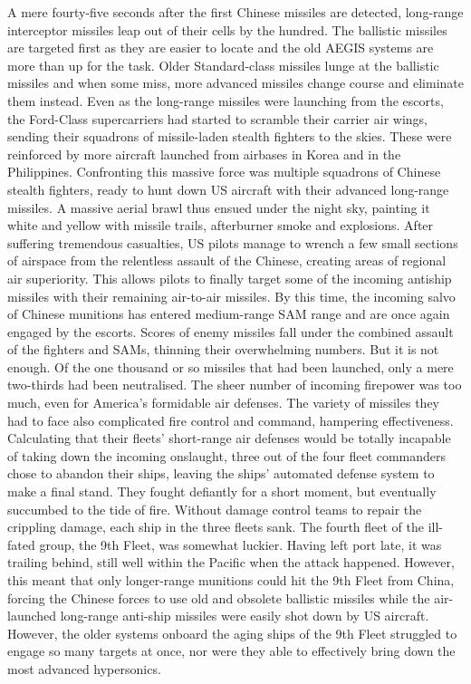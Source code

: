             A mere fourty-five seconds after the first Chinese missiles are detected, long-range interceptor missiles leap out of their cells by the hundred. The ballistic missiles are targeted first as they are easier to locate and the old AEGIS systems are more than up for the task. Older Standard-class missiles lunge at the ballistic missiles and when some miss, more advanced missiles change course and eliminate them instead.
            Even as the long-range missiles were launching from the escorts, the Ford-Class supercarriers had started to scramble their carrier air wings, sending their squadrons of missile-laden stealth fighters to the skies. These were reinforced by more aircraft launched from airbases in Korea and in the Philippines. Confronting this massive force was multiple squadrons of Chinese stealth fighters, ready to hunt down US aircraft with their advanced long-range missiles. A massive aerial brawl thus ensued under the night sky, painting it white and yellow with missile trails, afterburner smoke and explosions. After suffering tremendous casualties, US pilots manage to wrench a few small sections of airspace from the relentless assault of the Chinese, creating areas of regional air superiority. This allows pilots to finally target some of the incoming antiship missiles with their remaining air-to-air missiles.
            By this time, the incoming salvo of Chinese munitions has entered medium-range SAM range and are once again engaged by the escorts. Scores of enemy missiles fall under the combined assault of the fighters and SAMs, thinning their overwhelming numbers. But it is not enough. Of the one thousand or so missiles that had been launched, only a mere two-thirds had been neutralised. The sheer number of incoming firepower was too much, even for America's formidable air defenses. The variety of missiles they had to face also complicated fire control and command, hampering effectiveness.
            Calculating that their fleets' short-range air defenses would be totally incapable of taking down the incoming onslaught, three out of the four fleet commanders chose to abandon their ships, leaving the ships' automated defense system to make a final stand. They fought defiantly for a short moment, but eventually succumbed to the tide of fire. Without damage control teams to repair the crippling damage, each ship in the three fleets sank.
            The fourth fleet of the ill-fated group, the 9th Fleet, was somewhat luckier. Having left port late, it was trailing behind, still well within the Pacific when the attack happened. However, this meant that only longer-range munitions could hit the 9th Fleet from China, forcing the Chinese forces to use old and obsolete ballistic missiles while the air-launched long-range anti-ship missiles were easily shot down by US aircraft. However, the older systems onboard the aging ships of the 9th Fleet struggled to engage so many targets at once, nor were they able to effectively bring down the most advanced hypersonics.
